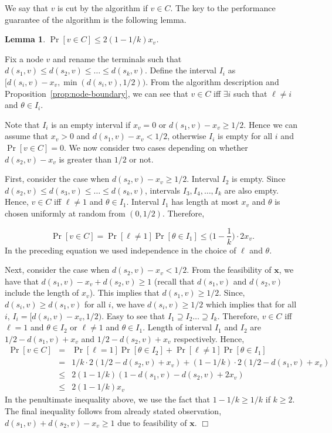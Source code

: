\documentclass[11pt]{article}
\newtheorem{lemma}{Lemma}[section]
\renewenvironment{proof}{\vspace{-0.1in}\noindent{\bf Proof:}}{\hspace*{\fill}$\Box$\par}
\def\bx{\textbf{x}}
\begin{document}
We say that $v$ is cut by the algorithm if $v \in C$.  The key to the
performance guarantee of the algorithm is the following lemma.
\begin{lemma}
  \label{lem:node-cut-prob}
  $\Pr[v \in C] \leq 2(1-1/k) x_v$.
\end{lemma}
\begin{proof}
  Fix a node $v$ and rename the terminals such that $d(s_1,v) \leq
  d(s_2,v) \leq \dots \leq d(s_k,v)$. Define the interval $I_i$ as
  $[d(s_i,v) - x_v, \min(d(s_i,v),1/2))$. From the algorithm
  description and Proposition~\ref{prop:node-boundary}, we can see
  that $v \in C$ iff $\exists i$ such that $\ell \neq i$ and $\theta
  \in I_i$.

  Note that $I_i$ is an empty interval if $x_v = 0$ or $d(s_1,v) - x_v
  \geq 1/2$. Hence we can assume that $x_v > 0$ and $d(s_1,v) - x_v <
  1/2$, otherwise $I_i$ is empty for all $i$ and $\Pr[v \in C] =
  0$. We now consider two cases depending on
  whether $d(s_2,v) - x_v$ is greater than $1/2$ or not.

  First, consider the case when $d(s_2,v) - x_v \geq 1/2$. Interval
  $I_2$ is empty. Since $d(s_2,v) \leq d(s_3,v) \leq \dots \leq
  d(s_k,v)$, intervals $I_3,I_4,\dots,I_k$ are also empty. Hence, $v\in
  C$ iff $\ell \neq 1$ and $\theta \in I_1$. Interval $I_1$ has length at
  most $x_v$ and $\theta$ is chosen uniformly at random from
  $(0,1/2)$. Therefore,

\begin{equation*}
  \Pr[ v \in C] = \Pr[\ell \neq 1] \Pr[\theta \in I_1] \leq \big(1-\frac{1}{k}\big) \cdot 2x_v.
\end{equation*}
In the preceding equation we used independence in the choice of $\ell$ and 
$\theta$.

Next, consider the case when $d(s_2,v) -x_v < 1/2$. From the
feasibility of $\bx$, we have that $d(s_1,v) - x_v + d(s_2,v) \geq 1$
(recall that $d(s_1,v)$ and $d(s_2,v)$ include the length of
$x_v$). This implies that $d(s_1,v) \geq 1/2$. Since, $d(s_i,v) \geq
d(s_1,v)$ for all $i$, we have $d(s_i,v) \geq 1/2$ which implies that
for all $i$, $I_i =[d(s_i,v) - x_v, 1/2)$. Easy to see that $I_1
\supseteq I_2\dots \supseteq I_k$. Therefore, $v \in C$ iff $\ell = 1$
and $\theta \in I_2$ or $\ell \neq 1$ and $\theta \in I_1$. Length of
interval $I_1$ and $I_2$ are $1/2-d(s_1,v) + x_v$ and $1/2 - d(s_2,v)
+ x_v$ respectively. Hence,
\begin{eqnarray*}
\Pr[v \in C ] &=& \Pr[\ell = 1] \Pr[ \theta \in I_2] + \Pr[\ell \neq 1] \Pr[\theta \in I_1]\\
		& = & 1/k\cdot 2(1/2-d(s_2,v)+x_v) + (1-1/k)\cdot 2(1/2-d(s_1,v) + x_v) \\
		& \leq & 2(1-1/k)(1-d(s_1,v) -d(s_2,v)+ 2 x_v) \\
		& \leq & 2(1-1/k) x_v
\end{eqnarray*}
In the penultimate inequality above, we use the fact that $1-1/k \geq
1/k$ if $k \geq 2$. The final inequality follows from already stated
observation, $d(s_1,v) + d(s_2,v) - x_v \geq 1$ due to feasibility of
$\bx$.
\end{proof}
\end{document}

